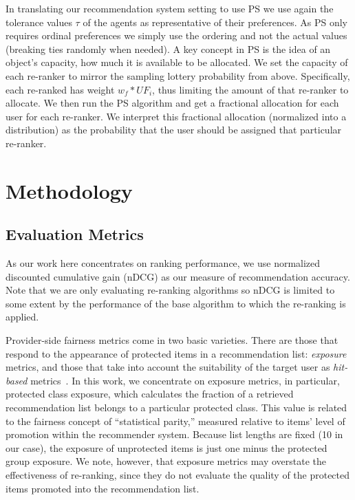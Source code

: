 In translating our recommendation system setting to use PS we use again the tolerance values $\tau$ of the agents as representative of their preferences.  As PS only requires ordinal preferences we simply use the ordering and not the actual values (breaking ties randomly when needed). A key concept in PS is the idea of an object's capacity, how much it is available to be allocated. We set the capacity of each re-ranker to mirror the sampling lottery probability from above. Specifically, each re-ranked has weight $w_f * UF_i$, thus limiting the amount of that re-ranker to allocate.  We then run the PS algorithm and get a fractional allocation for each user for each re-ranker.  We interpret this fractional allocation (normalized into a distribution) as the probability that the user should be assigned that particular re-ranker.

\section{Methodology}
\subsection{Evaluation Metrics}
As our work here concentrates on ranking performance, we use normalized discounted cumulative gain (nDCG) as our measure of recommendation accuracy. Note that we are only evaluating re-ranking algorithms so nDCG is limited to some extent by the performance of the base algorithm to which the re-ranking is applied. 

Provider-side fairness metrics come in two basic varieties. There are those that respond to the appearance of protected items in a recommendation list: \textit{exposure} metrics, and those that take into account the suitability of the target user as \textit{hit-based} metrics~\cite{abdollahpouri-umuai-2020}. In this work, we concentrate on exposure metrics, in particular, protected class exposure, which calculates the fraction of a retrieved recommendation list belongs to a particular protected class. This value is related to the fairness concept of ``statistical parity,'' measured relative to items' level of promotion within the recommender system. Because list lengths are fixed (10 in our case), the exposure of unprotected items is just one minus the protected group exposure. We note, however, that exposure metrics may overstate the effectiveness of re-ranking, since they do not evaluate the quality of the protected items promoted into the recommendation list.

